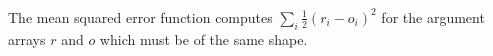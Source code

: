 \begin{code}
\AgdaSpace{}%
\AgdaSpace{}%
\AgdaSpace{}%
\<%
\\
%
\\[\AgdaEmptyExtraSkip]%
%
\>[2]\AgdaSpace{}%
\AgdaSymbol{:}\AgdaSpace{}%
\AgdaSpace{}%
\AgdaSpace{}%
\AgdaSpace{}%
\AgdaSpace{}%
\AgdaSymbol{(}\AgdaSpace{}%
\AgdaSymbol{:}\AgdaSpace{}%
\AgdaSpace{}%
\AgdaSpace{}%
\AgdaSymbol{(}\AgdaSpace{}%
\AgdaSymbol{(}\AgdaSpace{}%
\AgdaSpace{}%
\AgdaSpace{}%
\AgdaSpace{}%
\AgdaSpace{}%
\AgdaSpace{}%
\AgdaSpace{}%
\AgdaSpace{}%
\AgdaInductiveConstructor{[]}\AgdaSymbol{)))}\AgdaSpace{}%
\AgdaSpace{}%
\AgdaSpace{}%
\AgdaSpace{}%
\AgdaSymbol{(}\AgdaSpace{}%
\AgdaSymbol{(}\AgdaSpace{}%
\AgdaSpace{}%
\AgdaSpace{}%
\AgdaSpace{}%
\AgdaInductiveConstructor{[]}\AgdaSymbol{))}\<%
\\
%
\>[2]\AgdaSpace{}%
\AgdaSpace{}%
\AgdaSpace{}%
\AgdaSpace{}%
\AgdaSymbol{=}\AgdaSpace{}%
\AgdaSpace{}%
\AgdaSpace{}%
\AgdaSpace{}%
\AgdaSpace{}%
\AgdaSpace{}%
\AgdaSpace{}%
\AgdaOperator{\AgdaFunction{\$}}\AgdaSpace{}%
\AgdaSpace{}%
\AgdaSpace{}%
\AgdaSpace{}%
\AgdaSpace{}%
\AgdaSpace{}%
\AgdaSymbol{(}\AgdaSpace{}%
\AgdaSpace{}%
\AgdaSpace{}%
\AgdaSpace{}%
\AgdaSpace{}%
\AgdaSymbol{)}\AgdaSpace{}%
\<%
\end{code}
The mean squared error function  computes
$\sum_i \frac{1}{2}(r_i - o_i)^2$ for the argument arrays $r$ and $o$
which must be of the same shape.
